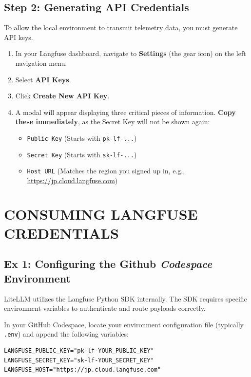 \documentclass[12pt,a4paper]{article}
\begin{document}
\subsection{Step 2: Generating API Credentials}
To allow the local environment to transmit telemetry data, you must generate API keys.

\begin{enumerate}
    \item In your Langfuse dashboard, navigate to \textbf{Settings} (the gear icon) on the left navigation menu.
    \item Select \textbf{API Keys}.
    \item Click \textbf{Create New API Key}.
    \item A modal will appear displaying three critical pieces of information. \textbf{Copy these immediately}, as the Secret Key will not be shown again:
    \begin{itemize}
        \item \texttt{Public Key} (Starts with \texttt{pk-lf-...})
        \item \texttt{Secret Key} (Starts with \texttt{sk-lf-...})
        \item \texttt{Host URL} (Matches the region you signed up in, e.g., \url{https://jp.cloud.langfuse.com})
    \end{itemize}
\end{enumerate}

\section{CONSUMING LANGFUSE CREDENTIALS}

\subsection{Ex 1: Configuring the Github \textit{Codespace} Environment}
LiteLLM utilizes the Langfuse Python SDK internally. The SDK requires specific environment variables to authenticate and route payloads correctly.

In your GitHub Codespace, locate your environment configuration file (typically \texttt{.env}) and append the following variables:

\begin{verbatim}
LANGFUSE_PUBLIC_KEY="pk-lf-YOUR_PUBLIC_KEY"
LANGFUSE_SECRET_KEY="sk-lf-YOUR_SECRET_KEY"
LANGFUSE_HOST="https://jp.cloud.langfuse.com" 
\end{verbatim}
\end{document}
